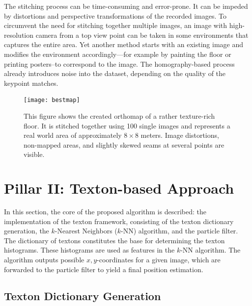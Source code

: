 \documentclass{report}
\begin{document}
The stitching process can be time-consuming and error-prone. It can be
impeded by distortions and perspective transformations of the recorded
images. To circumvent the need for stitching together multiple images,
an image with high-resolution camera from a top view point can be
taken in some environments that captures the entire area. Yet another
method starts with an existing image and modifies the environment
accordingly---for example by painting the floor or printing
posters--to correspond to the image.
The homography-based process already introduces noise into the
dataset, depending on the quality of the keypoint matches.
\begin{figure}[h!]
\begin{center}
\texttt{[image: bestmap]}
\caption{{\label{fig:orthomap}
This figure shows
    the created orthomap of a rather texture-rich floor. It is
    stitched together using 100 single images and represents a
    real world area of approximately $8\times8$ meters. Image
    distortions, non-mapped areas, and slightly skewed seams at
    several points are visible.%
}}
\end{center}
\end{figure}

\section{Pillar II: Texton-based Approach}
\label{sec:textons}

In this section, the core of the proposed algorithm is described: the
implementation of the texton framework, consisting of the texton
dictionary generation, the $k$-Nearest Neighbors ($k$-NN) algorithm,
and the particle filter. The dictionary of textons constitutes the
base for determining the texton histograms. These histograms are used
as features in the $k$-NN algorithm. The algorithm outputs possible
$x,y$-coordinates for a given image, which are forwarded to the
particle filter to yield a final position estimation.

\subsection{Texton Dictionary Generation}
\label{sec:text-dict-gener}
\end{document}
